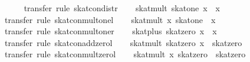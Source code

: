 \begin{isabellebody}
\ \ \ \ \isamarkupfalse%
\ {}transfer{}\ rule\ skat{}con{}distr{}\isanewline
\ \ \isamarkupfalse%
\ {}skat{}mult\ skat{}one\ x\ {}\ x{}\isanewline
\ \ \ \ \isamarkupfalse%
\ {}transfer{}\ rule\ skat{}con{}mult{}onel{}\isanewline
\ \ \isamarkupfalse%
\ {}skat{}mult\ x\ skat{}one\ {}\ x{}\isanewline
\ \ \ \ \isamarkupfalse%
\ {}transfer{}\ rule\ skat{}con{}mult{}oner{}\isanewline
\ \ \isamarkupfalse%
\ {}skat{}plus\ skat{}zero\ x\ {}\ x{}\isanewline
\ \ \ \ \isamarkupfalse%
\ {}transfer{}\ rule\ skat{}con{}add{}zerol{}\isanewline
\ \ \isamarkupfalse%
\ {}skat{}mult\ skat{}zero\ x\ {}\ skat{}zero{}\isanewline
\ \ \ \ \isamarkupfalse%
\ {}transfer{}\ rule\ skat{}con{}mult{}zerol{}\isanewline
\ \ \isamarkupfalse%
\ {}skat{}mult\ x\ skat{}zero\ {}\ skat{}zero{}\isanewline

\end{isabellebody}
